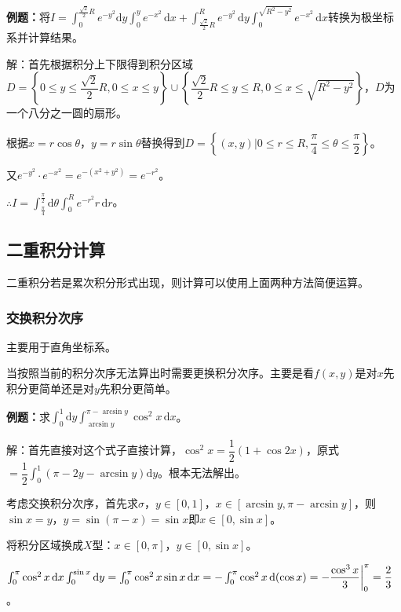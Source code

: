 \textbf{例题：}将$I=\int_0^{\frac{\sqrt{2}}{2}R}e^{-y^2}\textrm{d}y\int_0^ye^{-x^2}\,\textrm{d}x+\int_{\frac{\sqrt{2}}{2}R}^Re^{-y^2}\,\textrm{d}y\int_0^{\sqrt{R^2-y^2}}e^{-x^2}\,\textrm{d}x$转换为极坐标系并计算结果。

解：首先根据积分上下限得到积分区域$D=\left\{0\leqslant y\leqslant\dfrac{\sqrt{2}}{2}R,0\leqslant x\leqslant y\right\}\cup\left\{\dfrac{\sqrt{2}}{2}R\leqslant y\leqslant R,0\leqslant x\leqslant\sqrt{R^2-y^2}\right\}$，$D$为一个八分之一圆的扇形。

根据$x=r\cos\theta$，$y=r\sin\theta$替换得到$D=\left\{(x,y)\bigg|0\leqslant r\leqslant R,\dfrac{\pi}{4}\leqslant\theta\leqslant\dfrac{\pi}{2}\right\}$。

又$e^{-y^2}\cdot e^{-x^2}=e^{-(x^2+y^2)}=e^{-r^2}$。

$\therefore I=\int_{\frac{\pi}{4}}^{\frac{\pi}{2}}\textrm{d}\theta\int_0^Re^{-r^2}r\,\textrm{d}r$。

\subsection{二重积分计算}

二重积分若是累次积分形式出现，则计算可以使用上面两种方法简便运算。

\subsubsection{交换积分次序}

主要用于直角坐标系。

当按照当前的积分次序无法算出时需要更换积分次序。主要是看$f(x,y)$是对$x$先积分更简单还是对$y$先积分更简单。

\textbf{例题：}求$\int_0^1\textrm{d}y\int_{\arcsin y}^{\pi-\arcsin y}\cos^2x\,\textrm{d}x$。

解：首先直接对这个式子直接计算，$\cos^2x=\dfrac{1}{2}(1+\cos2x)$，原式$=\dfrac{1}{2}\int_0^1(\pi-2y-\arcsin y)\textrm{d}y$。根本无法解出。

考虑交换积分次序，首先求$\sigma$，$y\in[0,1]$，$x\in[\arcsin y,\pi-\arcsin y]$，则$\sin x=y$，$y=\sin(\pi-x)=\sin x$即$x\in[0,\sin x]$。

将积分区域换成$X$型：$x\in[0,\pi]$，$y\in[0,\sin x]$。

$\int_0^\pi\cos^2x\,\textrm{d}x\int_0^{\sin x}\textrm{d}y=\int_0^\pi\cos^2x\sin x\,\textrm{d}x=-\int_0^\pi\cos^2x\,\textrm{d}(\cos x)=-\dfrac{\cos^3x}{3}\bigg|_0^\pi\\=\dfrac{2}{3}$。

